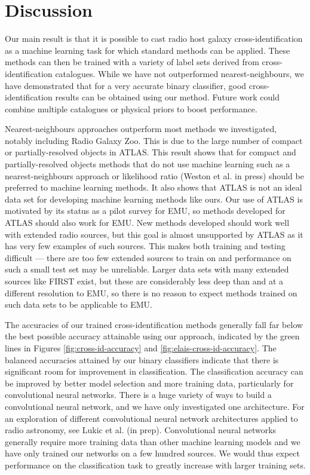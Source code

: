 \documentclass[fleqn,usenatbib,usedcolumn]{mnras}
\begin{document}
\section{Discussion}

  Our main result is that it is possible to cast radio host galaxy cross-identification as a machine learning task for which standard methods can be applied. These methods can then be trained with a variety of label sets derived from cross-identification catalogues. While we have not outperformed nearest-neighbours, we have demonstrated that for a very accurate binary classifier, good cross-identification results can be obtained using our method. Future work could combine multiple catalogues or physical priors to boost performance.

  Nearest-neighbours approaches outperform most methods we investigated, notably including Radio Galaxy Zoo. This is due to the large number of compact or partially-resolved objects in ATLAS. This result shows that for compact and partially-resolved objects methods that do not use machine learning such as a nearest-neighbours approach or likelihood ratio (Weston et al. in press) should be preferred to machine learning methods. It also shows that ATLAS is not an ideal data set for developing machine learning methods like ours. Our use of ATLAS is motivated by its status as a pilot survey for EMU, so methods developed for ATLAS should also work for EMU. New methods developed should work well with extended radio sources, but this goal is almost unsupported by ATLAS as it has very few examples of such sources. This makes both training and testing difficult --- there are too few extended sources to train on and performance on such a small test set may be unreliable. Larger data sets with many extended sources like FIRST exist, but these are considerably less deep than and at a different resolution to EMU, so there is no reason to expect methods trained on such data sets to be applicable to EMU.

  The accuracies of our trained cross-identification methods generally fall far below the best possible accuracy attainable using our approach, indicated by the green lines in Figures \ref{fig:cross-id-accuracy} and \ref{fig:elais-cross-id-accuracy}. The balanced accuracies attained by our
  binary classifiers indicate that there is significant room for improvement
  in classification. The classification accuracy can be improved by better
  model selection and more training data, particularly for convolutional
  neural networks. There is a huge variety of ways to build a convolutional
  neural network, and we have only investigated one architecture. For an
  exploration of different convolutional neural network architectures
  applied to radio astronomy, see Lukic et al. (in prep). Convolutional
  neural networks generally require more training data than other machine
  learning models and we have only trained our networks on a few hundred
  sources. We would thus expect performance on the classification task to
  greatly increase with larger training sets.
\end{document}
